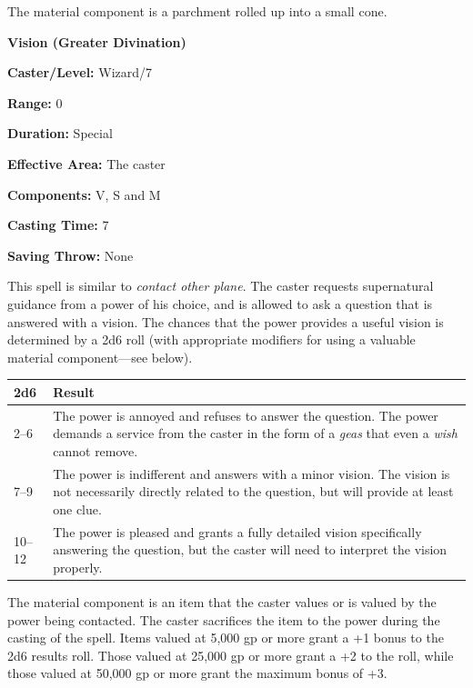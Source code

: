 \begin{multicols}{2}
The material component is a parchment rolled up into a small cone.

\vspace{1em}

\noindent
\begin{minipage}{\columnwidth}

\noindent \textbf{Vision (Greater Divination)}

\noindent \textbf{Caster/Level:} Wizard/7

\noindent \textbf{Range:} 0

\noindent \textbf{Duration:} Special

\noindent \textbf{Effective Area:} The caster

\noindent \textbf{Components:} V, S and M

\noindent \textbf{Casting Time:} 7

\noindent \textbf{Saving Throw:} None

\end{minipage}

This spell is similar to \textit{contact other plane}.  The caster requests supernatural guidance from a power of his choice, and is allowed to ask a question that is answered with a vision.  The chances that the power provides a useful vision is determined by a 2d6 roll (with appropriate modifiers for using a valuable material component---see below).

\noindent
\begin{tabular}{|p{}|p{}|}
\hline
2d6	& Result \\
\hline\hline
\rowcolor[gray]{.9}2--6	& The power is annoyed and refuses to answer the question.  The power demands a service from the caster in the form of a \textit{geas} that even a \textit{wish} cannot remove. \\
7--9	& The power is indifferent and answers with a minor vision.  The vision is not necessarily directly related to the question, but will provide at least one clue. \\
\rowcolor[gray]{.9}10--12	& The power is pleased and grants a fully detailed vision specifically answering the question, but the caster will need to interpret the vision properly. \\
\hline
\end{tabular}

The material component is an item that the caster values or is valued by the power being contacted.  The caster sacrifices the item to the power during the casting of the spell.   Items valued at 5,000 gp or more grant a +1 bonus to the 2d6 results roll.  Those valued at 25,000 gp or more grant a +2 to the roll, while those valued at 50,000 gp or more grant the maximum bonus of +3.


\end{multicols}
